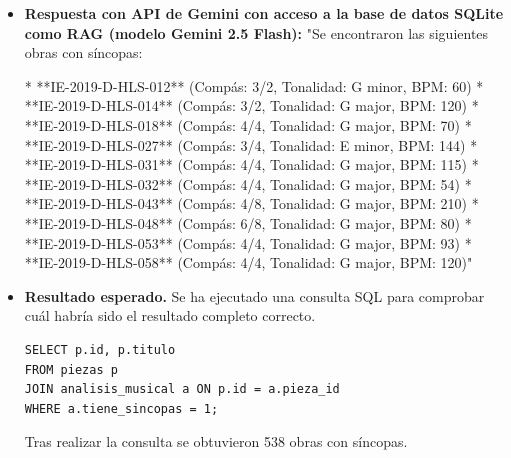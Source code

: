 \begin{itemize}
Es importante destacar que estas son solo algunas posibles interpretaciones de síncopas, ya que la definición de síncopa puede variar dependiendo del contexto musical y personal. Si necesitas más ayuda o aclaraciones sobre esto, no dudes en preguntar."
\item \textbf{Respuesta con API de Gemini con acceso a la base de datos SQLite como RAG (modelo Gemini 2.5 Flash):} "Se encontraron las siguientes obras con síncopas:

*   **IE-2019-D-HLS-012** (Compás: 3/2, Tonalidad: G minor, BPM: 60)
*   **IE-2019-D-HLS-014** (Compás: 3/2, Tonalidad: G major, BPM: 120)
*   **IE-2019-D-HLS-018** (Compás: 4/4, Tonalidad: G major, BPM: 70)
*   **IE-2019-D-HLS-027** (Compás: 3/4, Tonalidad: E minor, BPM: 144)
*   **IE-2019-D-HLS-031** (Compás: 4/4, Tonalidad: G major, BPM: 115)
*   **IE-2019-D-HLS-032** (Compás: 4/4, Tonalidad: G major, BPM: 54)
*   **IE-2019-D-HLS-043** (Compás: 4/8, Tonalidad: G major, BPM: 210)
*   **IE-2019-D-HLS-048** (Compás: 6/8, Tonalidad: G major, BPM: 80)
*   **IE-2019-D-HLS-053** (Compás: 4/4, Tonalidad: G major, BPM: 93)
*   **IE-2019-D-HLS-058** (Compás: 4/4, Tonalidad: G major, BPM: 120)"
\item \textbf{Resultado esperado.} Se ha ejecutado una consulta SQL para comprobar cuál habría sido el resultado completo correcto.
    \begin{verbatim}
SELECT p.id, p.titulo
FROM piezas p
JOIN analisis_musical a ON p.id = a.pieza_id
WHERE a.tiene_sincopas = 1;
    \end{verbatim}    
    Tras realizar la consulta se obtuvieron 538 obras con síncopas.
    
\end{itemize}

